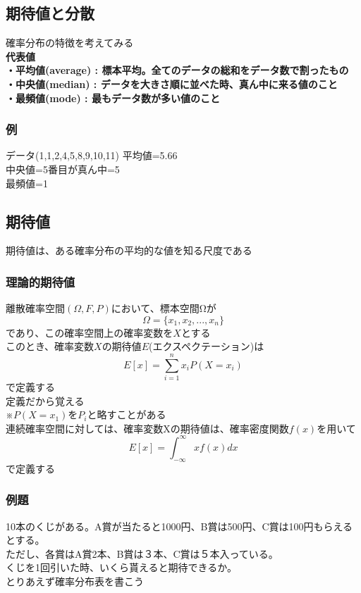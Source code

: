 \documentclass{jsarticle}
\begin{document}
	\subsection{期待値と分散}
	確率分布の特徴を考えてみる\\
	\bf{代表値} \\
	・平均値(average) : 標本平均。全てのデータの総和をデータ数で割ったもの \\	
	・中央値(median) : データを大きさ順に並べた時、真ん中に来る値のこと \\
	・最頻値(mode) : 最もデータ数が多い値のこと\\
		\subsubsection{例 }
			データ(1,1,2,4,5,8,9,10,11)
			平均値=5.66\\
			中央値=5番目が真ん中=5\\
			最頻値=1\\
			
	\subsection{期待値}
		期待値は、ある確率分布の平均的な値を知る尺度である\\
		
		\subsubsection{理論的期待値}
			離散確率空間$(Ω , F , P)$において、標本空間Ωが
			\[
				\Omega=\{x_1,x_2, ... ,x_n\}
			\]
			であり、この確率空間上の確率変数を$X$とする\\
			このとき、確率変数$X$の期待値$E$(エクスペクテーション)は
			\[
				E[x]=\sum^n_{i=1}x_iP(X=x_i)
			\]
			で定義する\\
			定義だから覚える\\
			※$P(X=x_1)$を$P_i$と略すことがある	\\
			連続確率空間に対しては、確率変数Xの期待値は、確率密度関数$f(x)$を用いて
			\[
				E[x]=\int^∞_{-∞} xf(x)dx
			\]
			で定義する
			
		\subsubsection{例題}
			10本のくじがある。A賞が当たると1000円、B賞は500円、C賞は100円もらえるとする。\\
			ただし、各賞はA賞2本、B賞は３本、C賞は５本入っている。\\
			くじを1回引いた時、いくら貰えると期待できるか。\\
			とりあえず確率分布表を書こう\\
			
\end{document}
